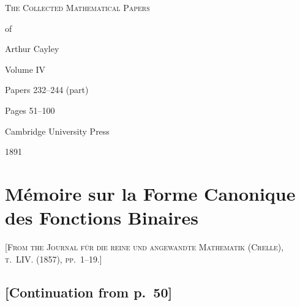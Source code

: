 \documentclass[11pt,a4paper]{article}
\begin{document}
\thispagestyle{empty}
\begin{center}
\vspace*{2cm}
{\Huge\scshape The Collected Mathematical Papers\par\vspace{0.3em} of\par\vspace{0.5em} Arthur Cayley\par\vspace{1.5em}}
{\LARGE Volume IV\par\vspace{1em}}
{\large Papers 232--244 (part)\par\vspace{0.5em}}
{\large Pages 51--100\par\vspace{2em}}
\vfill
{\large Cambridge University Press\par\vspace{0.3em}}
{\normalsize 1891}
\end{center}
\newpage

\tableofcontents
\newpage

\setcounter{page}{51}




\section{Mémoire sur la Forme Canonique des Fonctions Binaires}

\textsc{[From the Journal für die reine und angewandte Mathematik (Crelle), t.~LIV. (1857), pp.~1--19.]}
\label{paper:232}

\subsection*{[Continuation from p.~50]}
\end{document}
